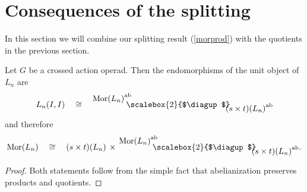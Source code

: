 \documentclass{amsbook} %
\newcommand{\MorLn}{\mathrm{Mor}(L_n)}
\newcommand{\bigquotient}[2]{ \raisebox{0.75\height}{$#1$} \mkern-12mu\scalebox{2}{$\diagup$}\mkern-10mu \raisebox{-0.5\height}{$#2$} }
\numberwithin{section}{chapter}
\begin{document}
\section{Consequences of the splitting}\label{conseq_spl}

In this section we will combine our splitting result (\cref{morprod}) with the quotients in the previous section.

\begin{cor}\label{Zmor1} Let $G$ be a crossed action operad. Then the endomorphisms of the unit object of $L_n$ are
\[ L_n(I, I) \quad \cong \quad \bigquotient{{\MorLn}^{\mathrm{ab}}}{{(s \times t)(L_n)}^{\mathrm{ab}}} \]
and therefore
\[ \MorLn \quad \cong \quad (s \times t)(L_n) \, \times \, \bigquotient{{\MorLn}^{\mathrm{ab}}}{{(s \times t)(L_n)}^{\mathrm{ab}}}. \]
\end{cor}
\begin{proof}
Both statements follow from the simple fact that abelianization preserves products and quotients.
\end{proof}
\end{document}
